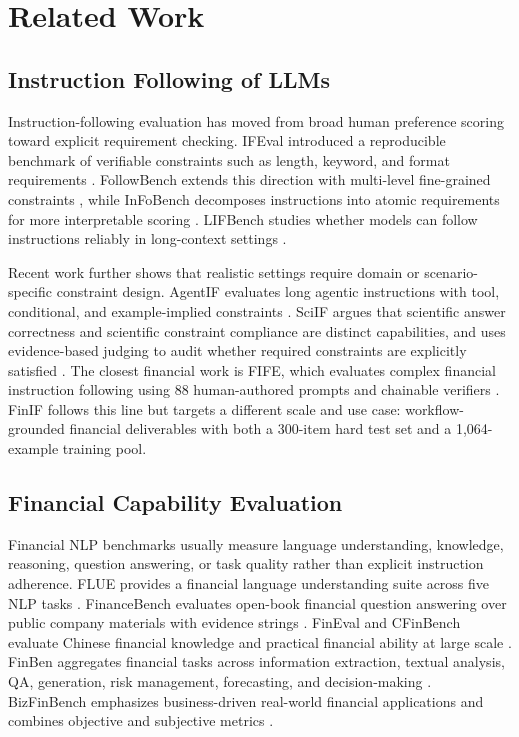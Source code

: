 \section{Related Work}

\subsection{Instruction Following of LLMs}

Instruction-following evaluation has moved from broad human preference scoring toward explicit requirement checking.
IFEval introduced a reproducible benchmark of verifiable constraints such as length, keyword, and format requirements \citep{zhou2023ifeval}.
FollowBench extends this direction with multi-level fine-grained constraints \citep{jiang2024followbench}, while InFoBench decomposes instructions into atomic requirements for more interpretable scoring \citep{qin2024infobench}.
LIFBench studies whether models can follow instructions reliably in long-context settings \citep{wu2025lifbench}.

Recent work further shows that realistic settings require domain or scenario-specific constraint design.
AgentIF evaluates long agentic instructions with tool, conditional, and example-implied constraints \citep{qi2025agentif}.
SciIF argues that scientific answer correctness and scientific constraint compliance are distinct capabilities, and uses evidence-based judging to audit whether required constraints are explicitly satisfied \citep{su2026sciif}.
The closest financial work is FIFE, which evaluates complex financial instruction following using 88 human-authored prompts and chainable verifiers \citep{matlin2025fife}.
FinIF follows this line but targets a different scale and use case: workflow-grounded financial deliverables with both a 300-item hard test set and a 1,064-example training pool.

\subsection{Financial Capability Evaluation}

Financial NLP benchmarks usually measure language understanding, knowledge, reasoning, question answering, or task quality rather than explicit instruction adherence.
FLUE provides a financial language understanding suite across five NLP tasks \citep{shah2022flue}.
FinanceBench evaluates open-book financial question answering over public company materials with evidence strings \citep{islam2023financebench}.
FinEval and CFinBench evaluate Chinese financial knowledge and practical financial ability at large scale \citep{guo2025fineval,nie2025cfinbench}.
FinBen aggregates financial tasks across information extraction, textual analysis, QA, generation, risk management, forecasting, and decision-making \citep{xie2024finben}.
BizFinBench emphasizes business-driven real-world financial applications and combines objective and subjective metrics \citep{lu2025bizfinbench}.


